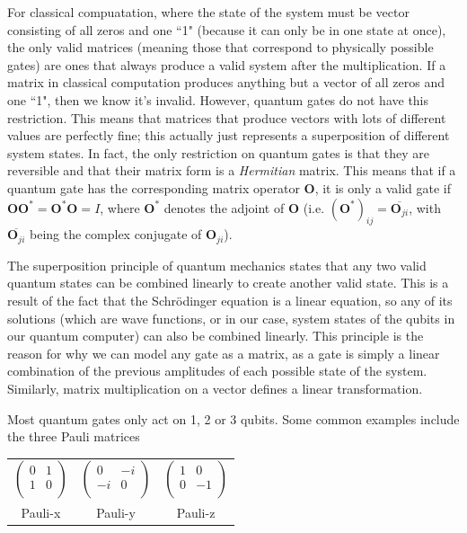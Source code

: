 \documentclass[11pt]{report}
\newcommand{\?}{\stackrel{?}{=}}
\begin{document}
For classical compuatation, where the state of the system must be vector consisting of all zeros and one ``1" (because it can only be in one state at once), the only valid matrices (meaning those that correspond to physically possible gates) are ones that always produce a valid system after the multiplication. If a matrix in classical computation produces anything but a vector of all zeros and one ``1", then we know it's invalid. However, quantum gates do not have this restriction. This means that matrices that produce vectors with lots of different values are perfectly fine; this actually just represents a superposition of different system states. In fact, the only restriction on quantum gates is that they are reversible and that their matrix form is a \textit{Hermitian} matrix. This means that if a quantum gate has the corresponding matrix operator $\mathbf{O}$, it is only a valid gate if $\mathbf{O}\mathbf{O}^* = \mathbf{O}^*\mathbf{O} = I$, where $\mathbf{O}^*$ denotes the adjoint of $\mathbf{O}$ (i.e. $(\mathbf{O}^*)_{ij} = \overline{\mathbf{O}_{ji}}$, with $\overline{\mathbf{O}_{ji}}$ being the complex conjugate of $\mathbf{O}_{ji}$).

The superposition principle of quantum mechanics states that any two valid quantum states can be combined linearly to create another valid state. This is a result of the fact that the Schrödinger equation is a linear equation, so any of its solutions (which are wave functions, or in our case, system states of the qubits in our quantum computer) can also be combined linearly. This principle is the reason for why we can model any gate as a matrix, as a gate is simply a linear combination of the previous amplitudes of each possible state of the system. Similarly, matrix multiplication on a vector defines a linear transformation.

Most quantum gates only act on 1, 2 or 3 qubits. Some common examples include the three Pauli matrices

\begin{table}[h!]
\centering
\begin{tabular}{ c c c }
  $\begin{pmatrix}
0 & 1 \\
1 & 0 \\
\end{pmatrix}$ & $\begin{pmatrix}
0 & -i \\
-i & 0 \\
\end{pmatrix}$ & $\begin{pmatrix}
1 & 0 \\
0 & -1 \\
\end{pmatrix}$ \\
  Pauli-x & Pauli-y & Pauli-z \\
\end{tabular}
\end{table}
\end{document}
